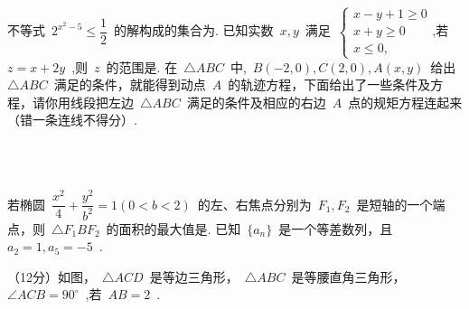 \documentclass{BHCexam}
\begin{document}
\begin{questions}
\tiankong
\question 不等式~$2^{x^2-5}\leq \dfrac{1}{2}$~的解构成的集合为\mtk{}.
\question 已知实数~$x,y$~满足~$ \begin{cases}
x-y+1\geq 0\\
x+y\geq 0 \\
x\leq 0,
\end{cases}$,若~$z=x+2y$~,则~$z$~的范围是\mtk{}.
\question 在~$\triangle ABC$~中,~$B(-2,0),C(2,0),A(x,y)$~给出~$\triangle ABC$~满足的条件，就能得到动点~$A$~的轨迹方程，下面给出了一些条件及方程，请你用线段把左边~$\triangle ABC$~满足的条件及相应的右边~$A$~点的规矩方程连起来（错一条连线不得分）.
\begin{center}
   \hspace{3cm}   \\
\vspace{0.5cm}
   \hspace{3cm}   \\
\vspace{0.5cm}
   \hspace{3cm}   
\end{center}
\question 若椭圆~$\dfrac{x^2}{4}+\dfrac{y^2}{b^2}=1(0<b<2)$~的左、右焦点分别为~$F_1,F_2$~是短轴的一个端点，则~$\triangle F_1BF_2$~的面积的最大值是\mtk{}.
\jianda
\question 已知~$\{a_n \}$~是一个等差数列，且~$a_2=1,a_5=-5$~.
\vspace{8cm}
\question （12分）如图，~$\triangle ACD$~是等边三角形，~$\triangle ABC$~是等腰直角三角形，~$\angle ACB=90^ {\circ}$~,若~$AB=2$~.
\begin{parts}

\end{parts}
\end{questions}
\end{document}
